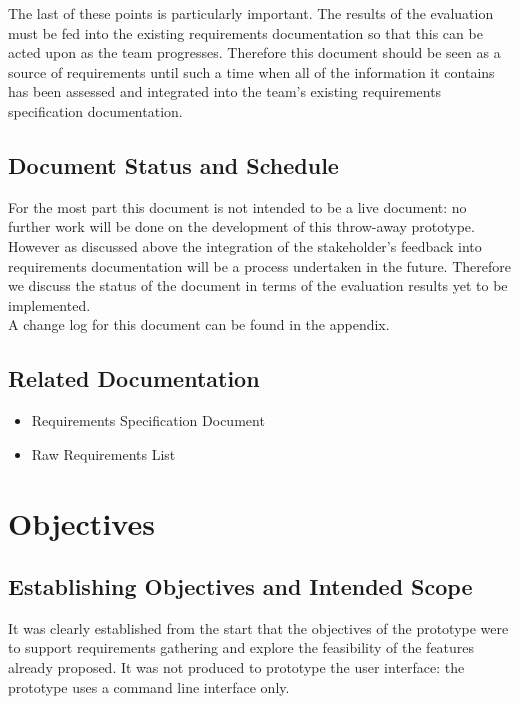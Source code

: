 \documentclass{l3deliverable}
\begin{document}
The last of these points is particularly important. The results of the evaluation must be fed into the existing requirements documentation so that this can be acted upon
as the team progresses. Therefore this document should be seen as a source of requirements until such a time when all of the information it contains has been
assessed and integrated into the team's existing requirements specification documentation.\\

\subsection{Document Status and Schedule}
For the most part this document is not intended to be a live document: no further work will be done on the development of this throw-away prototype.\\

However as discussed above the integration of the stakeholder's feedback into requirements documentation will be a process undertaken in the future. Therefore we discuss
the status of the document in terms of the evaluation results yet to be implemented.\\

A change log for this document can be found in the appendix.\\

\subsection{Related Documentation}
\begin{itemize}
\item{Requirements Specification Document}
\item{Raw Requirements List}
\end{itemize}


\section{Objectives}
\subsection{Establishing Objectives and Intended Scope}
It was clearly established from the start that the objectives of the prototype were to support requirements gathering and explore the feasibility of the features already
proposed. It was not produced to prototype the user interface: the prototype uses a command line interface only.\\
\end{document}
